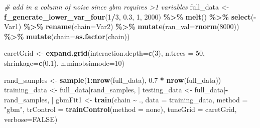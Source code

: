 \documentclass[
]{article}
\newenvironment{Shaded}{\begin{snugshade}}{\end{snugshade}}
\newcommand{\AttributeTok}[1]{\textcolor[rgb]{0.13,0.29,0.53}{#1}}
\newcommand{\CommentTok}[1]{\textcolor[rgb]{0.56,0.35,0.01}{\textit{#1}}}
\newcommand{\ConstantTok}[1]{\textcolor[rgb]{0.56,0.35,0.01}{#1}}
\newcommand{\DecValTok}[1]{\textcolor[rgb]{0.00,0.00,0.81}{#1}}
\newcommand{\FloatTok}[1]{\textcolor[rgb]{0.00,0.00,0.81}{#1}}
\newcommand{\FunctionTok}[1]{\textcolor[rgb]{0.13,0.29,0.53}{\textbf{#1}}}
\newcommand{\NormalTok}[1]{#1}
\newcommand{\OtherTok}[1]{\textcolor[rgb]{0.56,0.35,0.01}{#1}}
\newcommand{\SpecialCharTok}[1]{\textcolor[rgb]{0.81,0.36,0.00}{\textbf{#1}}}
\newcommand{\StringTok}[1]{\textcolor[rgb]{0.31,0.60,0.02}{#1}}
\begin{document}
\begin{Shaded}
\begin{Highlighting}[]
\CommentTok{\# add in a column of noise since gbm requires \textgreater{}1 variables}
\NormalTok{full\_data }\OtherTok{\textless{}{-}} \FunctionTok{f\_generate\_lower\_var\_four}\NormalTok{(}\DecValTok{1}\SpecialCharTok{/}\DecValTok{3}\NormalTok{, }\FloatTok{0.3}\NormalTok{, }\DecValTok{1}\NormalTok{, }\DecValTok{2000}\NormalTok{) }\SpecialCharTok{\%\textgreater{}\%} 
  \FunctionTok{melt}\NormalTok{() }\SpecialCharTok{\%\textgreater{}\%} 
  \FunctionTok{select}\NormalTok{(}\SpecialCharTok{{-}}\NormalTok{Var1) }\SpecialCharTok{\%\textgreater{}\%} 
  \FunctionTok{rename}\NormalTok{(}\AttributeTok{chain=}\NormalTok{Var2) }\SpecialCharTok{\%\textgreater{}\%} 
  \FunctionTok{mutate}\NormalTok{(}\AttributeTok{ran\_val=}\FunctionTok{rnorm}\NormalTok{(}\DecValTok{8000}\NormalTok{)) }\SpecialCharTok{\%\textgreater{}\%} 
  \FunctionTok{mutate}\NormalTok{(}\AttributeTok{chain=}\FunctionTok{as.factor}\NormalTok{(chain))}

\NormalTok{caretGrid }\OtherTok{\textless{}{-}} \FunctionTok{expand.grid}\NormalTok{(}\AttributeTok{interaction.depth=}\FunctionTok{c}\NormalTok{(}\DecValTok{3}\NormalTok{), }\AttributeTok{n.trees =} \DecValTok{50}\NormalTok{,}
                   \AttributeTok{shrinkage=}\FunctionTok{c}\NormalTok{(}\FloatTok{0.1}\NormalTok{),}
                   \AttributeTok{n.minobsinnode=}\DecValTok{10}\NormalTok{)}

\NormalTok{rand\_samples }\OtherTok{\textless{}{-}} \FunctionTok{sample}\NormalTok{(}\DecValTok{1}\SpecialCharTok{:}\FunctionTok{nrow}\NormalTok{(full\_data), }\FloatTok{0.7} \SpecialCharTok{*} \FunctionTok{nrow}\NormalTok{(full\_data))}
\NormalTok{training\_data }\OtherTok{\textless{}{-}}\NormalTok{ full\_data[rand\_samples, ]}
\NormalTok{testing\_data }\OtherTok{\textless{}{-}}\NormalTok{ full\_data[}\SpecialCharTok{{-}}\NormalTok{rand\_samples, ]}
\NormalTok{gbmFit1 }\OtherTok{\textless{}{-}} \FunctionTok{train}\NormalTok{(chain }\SpecialCharTok{\textasciitilde{}}\NormalTok{ ., }\AttributeTok{data =}\NormalTok{ training\_data, }
                 \AttributeTok{method =} \StringTok{"gbm"}\NormalTok{,}
                 \AttributeTok{trControl =} \FunctionTok{trainControl}\NormalTok{(}\AttributeTok{method =} \StringTok{\textquotesingle{}none\textquotesingle{}}\NormalTok{), }
                    \AttributeTok{tuneGrid =}\NormalTok{ caretGrid, }\AttributeTok{verbose=}\ConstantTok{FALSE}\NormalTok{)}


\end{Highlighting}
\end{Shaded}
\end{document}
